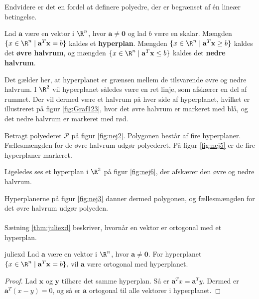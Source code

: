 Endvidere er det en fordel at definere polyedre, der er begrænset af én lineær betingelse. 
%
\begin{defn}{}{}
Lad $\mathbf{a}$ være en vektor i $\R^n$, hvor $\mathbf{a} \neq \mathbf{0}$ og lad $b$ være en skalar.
Mængden $\{x \in \R^n \mid \mathbf{a}^T \mathbf{x}=b\}$ kaldes et \textbf{hyperplan}.
%
Mængden $\{x \in \R^n \mid \mathbf{a}^T \mathbf{x} \geq b\}$ kaldes det \textbf{øvre halvrum}, og
mængden $\{x \in \R^n \mid \mathbf{a}^T \mathbf{x} \leq b\}$ kaldes det \textbf{nedre halvrum}.
\end{defn}
\noindent
%
Det gælder her, at hyperplanet er grænsen mellem de tilsvarende øvre og nedre halvrum.
I $\R^2$ vil hyperplanet således være en ret linje, som afskærer en del af rummet. 
Der vil dermed være et halvrum på hver side af hyperplanet, hvilket er illustreret på figur \ref{fig:Graf123}, hvor det øvre halvrum er markeret med blå, og det nedre halvrum er markeret med rød. 
%

%
Betragt polyederet $\mathcal{P}$ på figur \ref{fig:nej2}. 
Polygonen består af fire hyperplaner. 
Fællesmængden for de øvre halvrum udgør polyederet.
På figur \ref{fig:nej5} er de fire hyperplaner markeret. 
%
%

% 
%
%
Ligeledes ses et hyperplan i $\R^3$ på figur \ref{fig:nej6}, der afskærer den øvre og nedre halvrum.
%
%

%
%
Hyperplanerne på figur \ref{fig:nej3} danner dermed polygonen, og fællesmængden for det øvre halvrum udgør polyeden. 
\\\\
%
%
%
Sætning \ref{thm:juliexd} beskriver, hvornår en vektor er  ortogonal med et hyperplan. 
%
\begin{thm}{}{juliexd}
Lad $\mathbf{a}$ være en vektor i $\R^n$, hvor 
$\mathbf{a} \neq \mathbf{0}.$
For hyperplanet 
$\{x \in \R^n \mid \mathbf{a}^T \mathbf{x}=b\},$ 
vil $\mathbf{a}$ være ortogonal med hyperplanet.
\end{thm}
\begin{proof}
Lad $\mathbf{x}$ og $\mathbf{y}$ tilhøre det samme hyperplan. 
Så er $\mathbf{a}^Tx=\mathbf{a}^Ty.$
Dermed er $\mathbf{a}^T(x-y)=0$, og så er $\mathbf{a}$ ortogonal til alle vektorer i hyperplanet. 
\end{proof}
